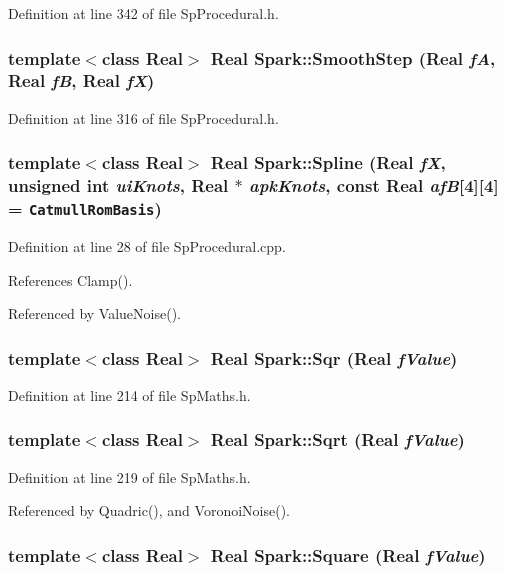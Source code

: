 Definition at line 342 of file Sp\-Procedural.h.
\subsubsection{\setlength{\rightskip}{0pt plus 5cm}template$<$class Real$>$ Real Spark::Smooth\-Step (Real {\em f\-A}, Real {\em f\-B}, Real {\em f\-X})}\label{namespaceSpark_a102}


Definition at line 316 of file Sp\-Procedural.h.
\subsubsection{\setlength{\rightskip}{0pt plus 5cm}template$<$class Real$>$ Real Spark::Spline (Real {\em f\-X}, unsigned int {\em ui\-Knots}, Real $\ast$ {\em apk\-Knots}, const Real {\em af\-B}[4][4] = {\tt CatmullRomBasis})}\label{namespaceSpark_a72}


Definition at line 28 of file Sp\-Procedural.cpp.

References Clamp().

Referenced by Value\-Noise().
\subsubsection{\setlength{\rightskip}{0pt plus 5cm}template$<$class Real$>$ Real Spark::Sqr (Real {\em f\-Value})}\label{namespaceSpark_a50}


Definition at line 214 of file Sp\-Maths.h.
\subsubsection{\setlength{\rightskip}{0pt plus 5cm}template$<$class Real$>$ Real Spark::Sqrt (Real {\em f\-Value})}\label{namespaceSpark_a51}


Definition at line 219 of file Sp\-Maths.h.

Referenced by Quadric(), and Voronoi\-Noise().
\subsubsection{\setlength{\rightskip}{0pt plus 5cm}template$<$class Real$>$ Real Spark::Square (Real {\em f\-Value})}\label{namespaceSpark_a49}


